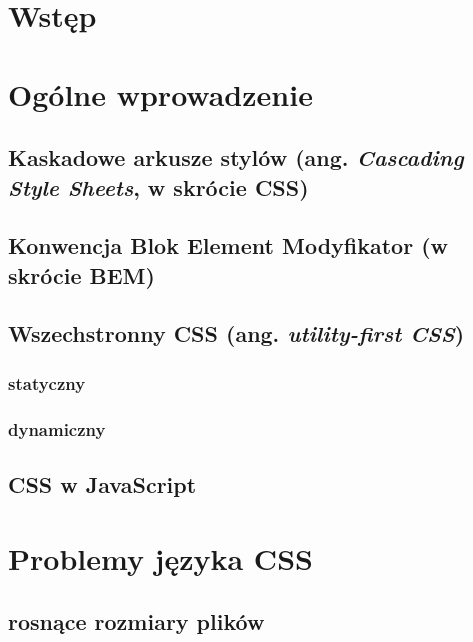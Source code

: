 \documentclass[a4paper,12pt]{book} %
\begin{document}
\sloppy



\thispagestyle{empty}


\newpage{}

\thispagestyle{empty}

\newpage{}



\tableofcontents{}






\chapter*{Wstęp}

\chapter{Ogólne wprowadzenie}
\section{Kaskadowe arkusze stylów (ang. \emph{Cascading Style Sheets}, w skrócie CSS)}
\section{Konwencja Blok Element Modyfikator (w skrócie BEM)}
\section{Wszechstronny CSS (ang. \emph{utility-first CSS})}
\subsection{statyczny}
\subsection{dynamiczny}

\section{CSS w JavaScript}

\chapter{Problemy języka CSS}
\section{rosnące rozmiary plików}
\end{document}
